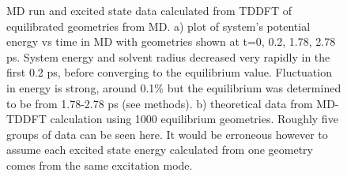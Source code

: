 \documentclass[
journal=jpcbfk, %
manuscript=article]{achemso}
\begin{document}
\begin{figure}[!htb]
	\centering
	\begin{subfigure}[b]{0.49\textwidth}
		\caption{}\label{fig:MDdataa)}
	\end{subfigure}
	\hfill
	\begin{subfigure}[b]{0.49\textwidth}
		\caption{}\label{fig:MDdatab)}
	\end{subfigure}
	\caption{MD run and excited state data calculated from TDDFT of equilibrated geometries from MD. a) plot of system's potential energy vs time in MD with geometries shown at t=0, 0.2, 1.78, 2.78 ps. System energy and solvent radius decreased very rapidly in the first 0.2 ps, before converging to the equilibrium value. Fluctuation in energy is strong, around 0.1\% but the equilibrium was determined to be from 1.78-2.78 ps (see methods). b) theoretical data from MD-TDDFT calculation using 1000 equilibrium geometries. Roughly five groups of data can be seen here. It would be erroneous however to assume each excited state energy calculated from one geometry comes from the same excitation mode.}
\end{figure}
\end{document}
